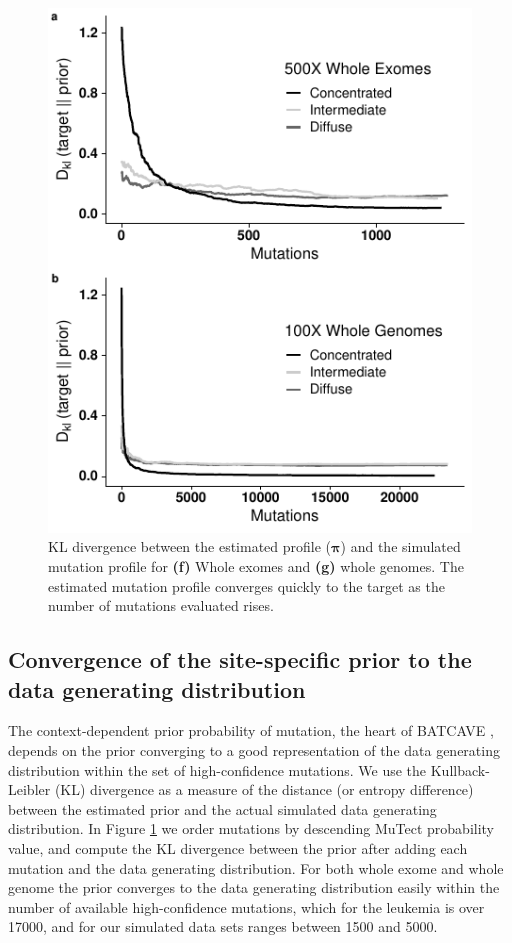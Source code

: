\documentclass[a4,center,fleqn]{NAR}
\newcommand{\batcave}{BATCAVE }
\begin{document}
\begin{figure}
  \begin{center}
  \includegraphics{figures/kl_only.pdf}
  \end{center}
  \caption{KL divergence between the estimated profile ($\boldsymbol{\pi}$) and the simulated mutation profile for \textbf{(f)} Whole exomes and \textbf{(g)} whole genomes.
  The estimated mutation profile converges quickly to the target as the number of mutations evaluated rises.}
\label{NAR-kl_fig}
\end{figure}

\subsection{Convergence of the site-specific prior to the data generating distribution}
The context-dependent prior probability of mutation, the heart of \batcave, depends on the prior converging to a good representation of the data generating distribution within the set of high-confidence mutations.
We use the Kullback-Leibler (KL) divergence as a measure of the distance (or entropy difference) between the estimated prior and the actual simulated data generating distribution.
In Figure \ref{NAR-kl_fig} we order mutations by descending MuTect probability value, and compute the KL divergence between the prior after adding each mutation and the data generating distribution.
For both whole exome and whole genome the prior converges to the data generating distribution easily within the number of available high-confidence mutations, which for the \citet{Griffith2015} leukemia is over 17000, and for our simulated data sets ranges between 1500 and 5000.
\end{document}
